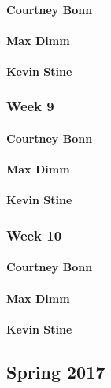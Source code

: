 \documentclass[letterpaper,10pt,draftclsnofoot,onecolumn,titlepage]{IEEEtran}
\begin{document}
			\paragraph{Courtney Bonn}

			\paragraph{Max Dimm}
			
			\paragraph{Kevin Stine}
		
		\subsubsection{Week 9}
		
			\paragraph{Courtney Bonn}

			\paragraph{Max Dimm}
			
			\paragraph{Kevin Stine}
			
		\subsubsection{Week 10}
		
			\paragraph{Courtney Bonn}

			\paragraph{Max Dimm}
			
			\paragraph{Kevin Stine}
			
	\subsection{Spring 2017}
	
\end{document}
